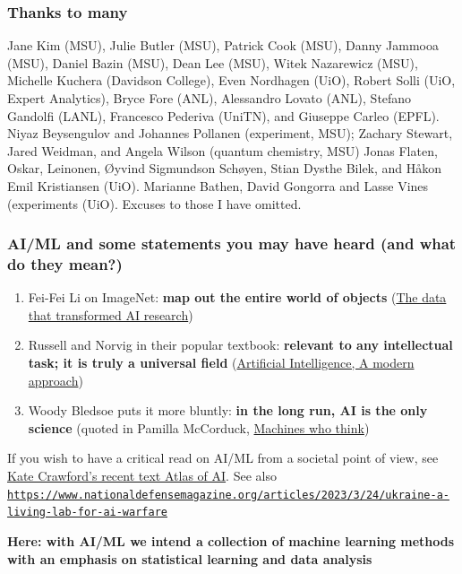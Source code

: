 \documentclass{beamer}
\begin{document}
\begin{frame}
\frametitle{Thanks to many}

Jane Kim (MSU), Julie Butler (MSU), Patrick Cook (MSU), Danny Jammooa (MSU), Daniel Bazin (MSU), Dean Lee (MSU), Witek Nazarewicz (MSU), Michelle Kuchera (Davidson College), Even Nordhagen (UiO), Robert Solli (UiO, Expert Analytics), Bryce Fore (ANL), Alessandro Lovato (ANL), Stefano Gandolfi (LANL), Francesco Pederiva (UniTN), and Giuseppe Carleo (EPFL). 
Niyaz Beysengulov and Johannes Pollanen (experiment, MSU); Zachary Stewart, Jared Weidman, and Angela Wilson (quantum chemistry, MSU)
Jonas Flaten, Oskar, Leinonen, Øyvind Sigmundson Schøyen, Stian Dysthe Bilek, and Håkon Emil Kristiansen (UiO). Marianne Bathen, David Gongorra and Lasse Vines (experiments (UiO). Excuses to those I have omitted.
\end{frame}

\begin{frame}
\frametitle{AI/ML and some statements you may have heard (and what do they mean?)}

\begin{enumerate}
\item Fei-Fei Li on ImageNet: \textbf{map out the entire world of objects} (\href{{https://cacm.acm.org/news/219702-the-data-that-transformed-ai-research-and-possibly-the-world/fulltext}}{The data that transformed AI research})

\item Russell and Norvig in their popular textbook: \textbf{relevant to any intellectual task; it is truly a universal field} (\href{{http://aima.cs.berkeley.edu/}}{Artificial Intelligence, A modern approach})

\item Woody Bledsoe puts it more bluntly: \textbf{in the long run, AI is the only science} (quoted in Pamilla McCorduck, \href{{https://www.pamelamccorduck.com/machines-who-think}}{Machines who think})
\end{enumerate}

\noindent
If you wish to have a critical read on AI/ML from a societal point of view, see \href{{https://www.katecrawford.net/}}{Kate Crawford's recent text Atlas of AI}. See also \href{{https://www.nationaldefensemagazine.org/articles/2023/3/24/ukraine-a-living-lab-for-ai-warfare}}{\nolinkurl{https://www.nationaldefensemagazine.org/articles/2023/3/24/ukraine-a-living-lab-for-ai-warfare}}

\textbf{Here: with AI/ML we intend a collection of machine learning methods with an emphasis on statistical learning and data analysis}
\end{frame}
\end{document}
